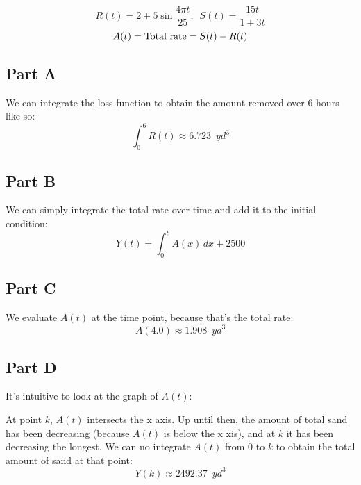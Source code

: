 \[ R(t) = 2 + 5 \sin{\frac{4 \pi t}{25}}, \enspace S(t) = \frac{15t}{1 + 3t} \]
\[ A(t) = \textnormal{Total rate} = S(t) - R(t) \]
\subsection{Part A}
We can integrate the loss function to obtain the amount removed over 6 hours like so:
\[ \int_{0}^{6} R(t) \approx 6.723 \enspace yd^3 \]
\subsection{Part B}
We can simply integrate the total rate over time and add it to the initial condition:
\[ Y(t) = \int_{0}^{t} A(x) \, dx + 2500 \]
\subsection{Part C}
We evaluate $A(t)$ at the time point, because that's the total rate:
\[ A(4.0) \approx 1.908 \enspace yd^3 \]
\subsection{Part D}
It's intuitive to look at the graph of $A(t)$:
\begin{center}
\end{center}
At point $k$, $A(t)$ intersects the x axis. Up until then, the amount of total sand has been decreasing (because $A(t)$ is below the x xis), and at $k$ it has been decreasing the longest. We can no integrate $A(t)$ from $0$ to $k$ to obtain the total amount of sand at that point:
\[ Y(k) \approx 2492.37 \enspace yd^3 \]
